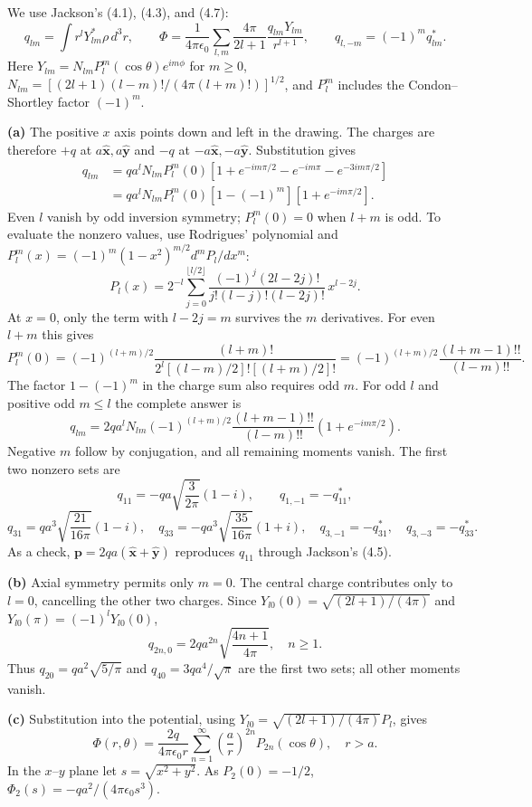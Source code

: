 We use Jackson's (4.1), (4.3), and (4.7):
\[
q_{lm}=\int r^lY_{lm}^{*}\rho\,d^3r,\qquad
\Phi=\frac{1}{4\pi\epsilon_0}\sum_{l,m}\frac{4\pi}{2l+1}
\frac{q_{lm}Y_{lm}}{r^{l+1}},\qquad q_{l,-m}=(-1)^m q_{lm}^{*}.
\]
Here $Y_{lm}=N_{lm}P_l^m(\cos\theta)e^{im\phi}$ for $m\geq0$,
$N_{lm}=[(2l+1)(l-m)!/(4\pi(l+m)!)]^{1/2}$, and $P_l^m$
includes the Condon--Shortley factor $(-1)^m$.

\textbf{(a)} The positive $x$ axis points down and left in the drawing.
The charges are therefore $+q$ at $a\hat{\mathbf x},a\hat{\mathbf y}$ and
$-q$ at $-a\hat{\mathbf x},-a\hat{\mathbf y}$. Substitution gives
\begin{align*}
q_{lm}&=qa^lN_{lm}P_l^m(0)
[1+e^{-im\pi/2}-e^{-im\pi}-e^{-3im\pi/2}]\\
&=qa^lN_{lm}P_l^m(0)[1-(-1)^m][1+e^{-im\pi/2}].
\end{align*}
Even $l$ vanish by odd inversion symmetry; $P_l^m(0)=0$ when $l+m$
is odd. To evaluate the nonzero values, use Rodrigues' polynomial
and $P_l^m(x)=(-1)^m(1-x^2)^{m/2}d^mP_l/dx^m$:
\[
P_l(x)=2^{-l}\sum_{j=0}^{\lfloor l/2\rfloor}
\frac{(-1)^j(2l-2j)!}{j!(l-j)!(l-2j)!}\,x^{l-2j}.
\]
At $x=0$, only the term with $l-2j=m$ survives the $m$ derivatives.
For even $l+m$ this gives
\[
P_l^m(0)=(-1)^{(l+m)/2}
\frac{(l+m)!}{2^l[(l-m)/2]![(l+m)/2]!}
=(-1)^{(l+m)/2}\frac{(l+m-1)!!}{(l-m)!!}.
\]
The factor $1-(-1)^m$ in the charge sum also requires odd $m$.
For odd $l$ and positive odd $m\leq l$ the complete answer is
\[
\boxed{q_{lm}=2qa^lN_{lm}(-1)^{(l+m)/2}
\frac{(l+m-1)!!}{(l-m)!!}(1+e^{-im\pi/2}).}
\]
Negative $m$ follow by conjugation, and all remaining moments vanish.
The first two nonzero sets are
\[
q_{11}=-qa\sqrt{\frac{3}{2\pi}}(1-i),\qquad q_{1,-1}=-q_{11}^{*},
\]
\[
q_{31}=qa^3\sqrt{\frac{21}{16\pi}}(1-i),\quad
q_{33}=-qa^3\sqrt{\frac{35}{16\pi}}(1+i),\quad
q_{3,-1}=-q_{31}^{*},\quad q_{3,-3}=-q_{33}^{*}.
\]
As a check, $\mathbf p=2qa(\hat{\mathbf x}+\hat{\mathbf y})$ reproduces
$q_{11}$ through Jackson's (4.5).

\textbf{(b)} Axial symmetry permits only $m=0$. The central charge
contributes only to $l=0$, cancelling the other two charges. Since
$Y_{l0}(0)=\sqrt{(2l+1)/(4\pi)}$ and
$Y_{l0}(\pi)=(-1)^lY_{l0}(0)$,
\[
\boxed{q_{2n,0}=2qa^{2n}\sqrt{\frac{4n+1}{4\pi}},\quad n\geq1.}
\]
Thus $q_{20}=qa^2\sqrt{5/\pi}$ and $q_{40}=3qa^4/\sqrt\pi$ are the
first two sets; all other moments vanish.

\textbf{(c)} Substitution into the potential, using
$Y_{l0}=\sqrt{(2l+1)/(4\pi)}P_l$, gives
\[
\boxed{\Phi(r,\theta)=\frac{2q}{4\pi\epsilon_0r}
\sum_{n=1}^{\infty}\left(\frac ar\right)^{2n}P_{2n}(\cos\theta),\quad r>a.}
\]
In the $x$--$y$ plane let $s=\sqrt{x^2+y^2}$. As $P_2(0)=-1/2$,
$\Phi_2(s)=-qa^2/(4\pi\epsilon_0s^3)$.


